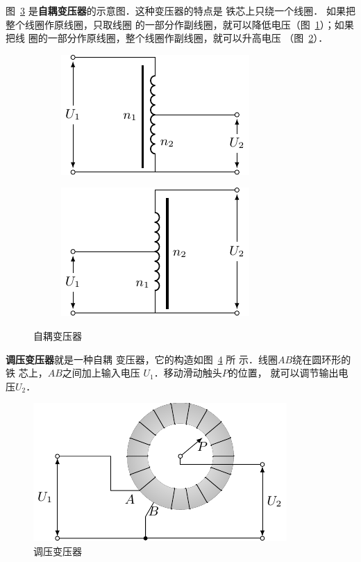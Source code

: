 图~\ref{fig_C_3-26} 是\textbf{自耦变压器}的示意图．这种变压器的特点是
铁芯上只绕一个线圈．
如果把整个线圈作原线圈，只取线圈
的一部分作副线圈，就可以降低电压（图~\ref{fig_C_3-26a}）；如果把线
圈的一部分作原线圈，整个线圈作副线圈，就可以升高电压
（图~\ref{fig_C_3-26b}）．
\begin{figure}[htbp]
    \centering
    \begin{subfigure}{0.4\linewidth}
        \centering
        \includegraphics{fig/C/3-26a.pdf}
        \caption{}\label{fig_C_3-26a}
    \end{subfigure}
    \hfil
    \begin{subfigure}{0.4\linewidth}
        \centering
        \includegraphics{fig/C/3-26b.pdf}
        \caption{}\label{fig_C_3-26b}
    \end{subfigure}
    \caption{自耦变压器}\label{fig_C_3-26}
\end{figure}

\textbf{调压变压器}就是一种自耦
变压器，它的构造如图~\ref{fig_C_3-27} 所
示．线圈$AB$绕在圆环形的铁
芯上，$AB$之间加上输入电压
$U_1$．移动滑动触头$P$的位置，
就可以调节输出电压$U_2$．
\begin{figure}[htbp]
    \centering
    \includegraphics{fig/C/3-27.pdf}
    \caption{调压变压器}\label{fig_C_3-27}
\end{figure}

